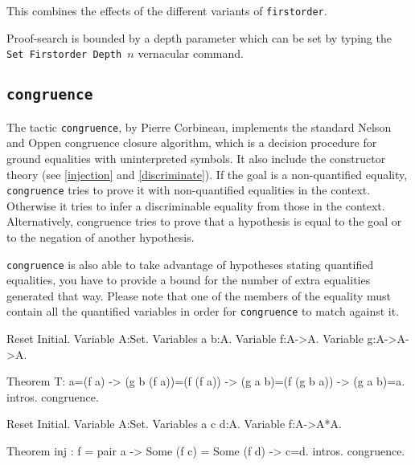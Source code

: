 \begin{coq_example*}
\begin{Variants}
  This combines the effects of the different variants of \texttt{firstorder}.

\end{Variants}

Proof-search is bounded by a depth parameter which can be set by typing the
{\nobreak \tt Set Firstorder Depth $n$} 
vernacular command.


\subsection{\tt congruence}
\label{congruence}

The tactic {\tt congruence}, by Pierre Corbineau, implements the standard Nelson and Oppen
congruence closure algorithm, which is a decision procedure for ground
equalities with uninterpreted symbols. It also include the constructor theory
(see \ref{injection} and \ref{discriminate}).
If the goal is a non-quantified equality, {\tt congruence} tries to
prove it with non-quantified equalities in the context. Otherwise it
tries to infer a discriminable equality from those in the context. Alternatively, congruence tries to prove that a hypothesis is equal to the goal or to the negation of another hypothesis.

{\tt congruence} is also able to take advantage of hypotheses stating quantified equalities, you have to provide a bound for the number of extra equalities generated that way. Please note that one of the members of the equality must contain all the quantified variables in order for {\tt congruence} to match against it.

\begin{coq_eval}
Reset Initial.
Variable A:Set.
Variables a b:A.
Variable f:A->A.
Variable g:A->A->A.
\end{coq_eval}

\begin{coq_example}
Theorem T:
  a=(f a) -> (g b (f a))=(f (f a)) -> (g a b)=(f (g b a)) -> (g a b)=a.
intros.
congruence.
\end{coq_example}

\begin{coq_eval}
Reset Initial.
Variable A:Set.
Variables a c d:A.
Variable f:A->A*A.
\end{coq_eval}

\begin{coq_example}
Theorem inj : f = pair a -> Some (f c) = Some (f d) -> c=d.
intros.
congruence.
\end{coq_example}


\end{coq_example*}
